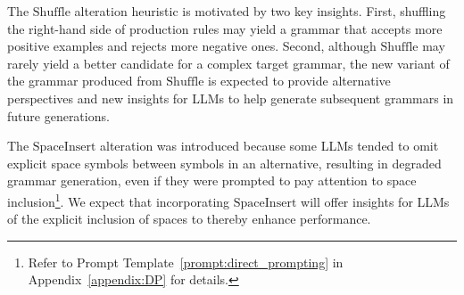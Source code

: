 \begin{itemize}
    
    

\end{itemize}
    The $\mathrm{Shuffle}$ alteration heuristic is motivated by two key insights. First, shuffling the right-hand side of production rules may yield a grammar that accepts more positive examples and rejects more negative ones.  Second, although $\mathrm{Shuffle}$ may rarely yield a better candidate for a complex target grammar, the new variant of the grammar produced from $\mathrm{Shuffle}$ is expected to provide alternative perspectives and new insights for LLMs to help generate subsequent grammars in future generations.
    
    The $\mathrm{SpaceInsert}$ alteration was introduced because some LLMs tended to omit explicit space symbols between symbols in an alternative, resulting in degraded grammar generation, even if they were prompted to pay attention to space inclusion\footnote{Refer to Prompt Template~\ref{prompt:direct_prompting} in Appendix~\ref{appendix:DP} for details.}. We expect that incorporating $\mathrm{SpaceInsert}$ will offer insights for LLMs of the explicit inclusion of spaces to thereby enhance performance.
    


